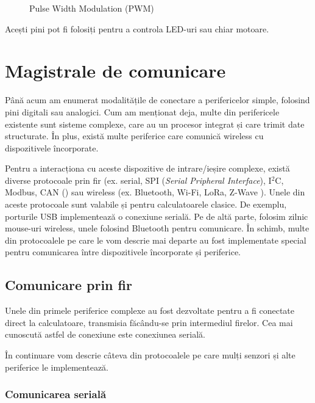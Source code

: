 \begin{figure}[htbp]
	\centering
	\def\svgwidth{\columnwidth}
        
        \caption{Pulse Width Modulation (PWM)}
	\label{fig:embed-pwm}
\end{figure}

Acești pini pot fi folosiți pentru a controla LED-uri sau chiar motoare.

\section{Magistrale de comunicare}
\label{sec:embed:bus}

Până acum am enumerat modalitățile de conectare a perifericelor simple, folosind
pini digitali sau analogici. Cum am menționat deja, multe din perifericele
existente sunt sisteme complexe, care au un procesor integrat și care trimit
date structurate. În plus, există multe periferice care comunică wireless cu
dispozitivele încorporate.

Pentru a interacționa cu aceste dispozitive de intrare/ieșire complexe, există
diverse protocoale prin fir (ex. serial, SPI (\textit{Serial Pripheral Interface}), I$^2$C, Modbus, CAN () sau wireless
(ex. Bluetooth, Wi-Fi, LoRa, Z-Wave ). Unele din aceste protocoale sunt valabile
și pentru calculatoarele clasice. De exemplu, porturile USB implementează o
conexiune serială. Pe de altă parte, folosim zilnic mouse-uri wireless, unele
folosind Bluetooth pentru comunicare. În schimb, multe din protocoalele pe care
le vom descrie mai departe au fost implementate special pentru comunicarea între
dispozitivele încorporate și periferice.

\subsection{Comunicare prin fir}
\label{sec:embed:bus:wired}

Unele din primele periferice complexe au fost dezvoltate pentru a fi conectate
direct la calculatoare, transmisia făcându-se prin intermediul firelor. Cea mai
cunoscută astfel de conexiune este conexiunea serială.

În continuare vom descrie câteva din protocoalele pe care mulți senzori și alte
periferice le implementează.

\subsubsection{Comunicarea serială}
\label{sec:embed:bus:wired:serial}

